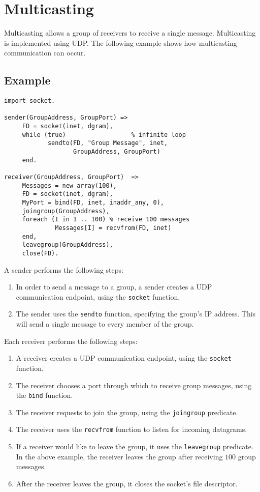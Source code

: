 \section{Multicasting}
Multicasting allows a group of receivers to receive a single message.  Multicasting is implemented using UDP.  The following example shows how multicasting communication can occur.

\subsection*{Example}
\begin{verbatim}
import socket.

sender(GroupAddress, GroupPort) =>
     FD = socket(inet, dgram),
     while (true)                  % infinite loop
            sendto(FD, "Group Message", inet, 
                   GroupAddress, GroupPort)
     end.

receiver(GroupAddress, GroupPort)  =>
     Messages = new_array(100),
     FD = socket(inet, dgram),
     MyPort = bind(FD, inet, inaddr_any, 0),
     joingroup(GroupAddress),
     foreach (I in 1 .. 100) % receive 100 messages
              Messages[I] = recvfrom(FD, inet)
     end,
     leavegroup(GroupAddress),
     close(FD). 
\end{verbatim}

A sender performs the following steps:
\begin{enumerate}
\item In order to send a message to a group, a sender creates a UDP communication endpoint, using the \texttt{socket} function.
\item The sender uses the \texttt{sendto} function, specifying the group's IP address.  This will send a single message to every member of the group.
\end{enumerate}

Each receiver performs the following steps:
\begin{enumerate}
\item A receiver creates a UDP communication endpoint, using the \texttt{socket} function.
\item The receiver chooses a port through which to receive group messages, using the \texttt{bind} function.
\item The receiver requests to join the group, using the \texttt{joingroup} predicate.
\item The receiver uses the \texttt{recvfrom} function to listen for incoming datagrams.
\item If a receiver would like to leave the group, it uses the \texttt{leavegroup} predicate.  In the above example, the receiver leaves the group after receiving $100$ group messages.
\item After the receiver leaves the group, it closes the socket's file descriptor.
\end{enumerate}

